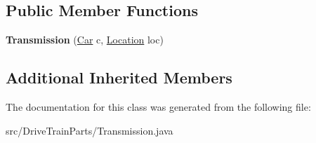 \subsection*{Public Member Functions}
\begin{DoxyCompactItemize}
\item 
\hypertarget{classDriveTrainParts_1_1Transmission_a0a5ddee913d6a2f38e862fa7c6c6a2bd}{}{\bfseries Transmission} (\hyperlink{classCars_1_1Car}{Car} c, \hyperlink{enumEnums_1_1Location}{Location} loc)\label{classDriveTrainParts_1_1Transmission_a0a5ddee913d6a2f38e862fa7c6c6a2bd}

\end{DoxyCompactItemize}
\subsection*{Additional Inherited Members}


The documentation for this class was generated from the following file\+:\begin{DoxyCompactItemize}
\item 
src/\+Drive\+Train\+Parts/Transmission.\+java\end{DoxyCompactItemize}
